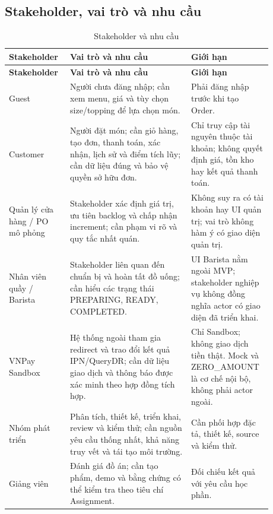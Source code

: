 \subsection{Stakeholder, vai trò và nhu cầu}
\begingroup\small
\renewcommand{\arraystretch}{1.2}
\begin{longtable}{>{\raggedright\arraybackslash}p{0.20\linewidth}>{\raggedright\arraybackslash}p{0.43\linewidth}>{\raggedright\arraybackslash}p{0.25\linewidth}}
\caption{Stakeholder và nhu cầu}\label{tab:auto-context-and-scope-1}\\
\hline
\textbf{Stakeholder} & \textbf{Vai trò và nhu cầu} & \textbf{Giới hạn} \\ \hline
\endfirsthead
\textbf{Stakeholder} & \textbf{Vai trò và nhu cầu} & \textbf{Giới hạn} \\ \hline
\endhead
Guest & Người chưa đăng nhập; cần xem menu, giá và tùy chọn size/topping để lựa chọn món. & Phải đăng nhập trước khi tạo Order. \\ \hline
Customer & Người đặt món; cần giỏ hàng, tạo đơn, thanh toán, xác nhận, lịch sử và điểm tích lũy; cần dữ liệu đúng và bảo vệ quyền sở hữu đơn. & Chỉ truy cập tài nguyên thuộc tài khoản; không quyết định giá, tồn kho hay kết quả thanh toán. \\ \hline
Quản lý cửa hàng / PO mô phỏng & Stakeholder xác định giá trị, ưu tiên backlog và chấp nhận increment; cần phạm vi rõ và quy tắc nhất quán. & Không suy ra có tài khoản hay UI quản trị; vai trò không hàm ý có giao diện quản trị. \\ \hline
Nhân viên quầy / Barista & Stakeholder liên quan đến chuẩn bị và hoàn tất đồ uống; cần hiểu các trạng thái PREPARING, READY, COMPLETED. & UI Barista nằm ngoài MVP; stakeholder nghiệp vụ không đồng nghĩa actor có giao diện đã triển khai. \\ \hline
VNPay Sandbox & Hệ thống ngoài tham gia redirect và trao đổi kết quả IPN/QueryDR; cần dữ liệu giao dịch và thông báo được xác minh theo hợp đồng tích hợp. & Chỉ Sandbox; không giao dịch tiền thật. Mock và ZERO\_AMOUNT là cơ chế nội bộ, không phải actor ngoài. \\ \hline
Nhóm phát triển & Phân tích, thiết kế, triển khai, review và kiểm thử; cần nguồn yêu cầu thống nhất, khả năng truy vết và tái tạo môi trường. & Cần phối hợp đặc tả, thiết kế, source và kiểm thử. \\ \hline
Giảng viên & Đánh giá đồ án; cần tạo phẩm, demo và bằng chứng có thể kiểm tra theo tiêu chí Assignment. & Đối chiếu kết quả với yêu cầu học phần. \\ \hline
\end{longtable}
\endgroup

